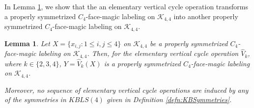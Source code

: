 \documentclass[10pt, reqno]{amsart}
\theoremstyle{definition}
\theoremstyle{plain}
\newtheorem{lemma}[definition]{Lemma}
\begin{document}
In Lemma \ref{lem:VerticalCycleOps}, we show that the
an elementary vertical cycle operation transforms a
properly symmetrized $C_4$-face-magic labeling on $\mathcal{K}_{4,4}$ into another
properly symmetrized $C_4$-face-magic labeling on $\mathcal{K}_{4,4}$.


\begin{lemma} \label{lem:VerticalCycleOps}
Let $X=\{ x_{i,j} : 1\le i,j\le 4\}$ on $\mathcal{K}_{4,4}$ 
be a properly symmetrized $C_4$-face-magic labeling on $\mathcal{K}_{4,4}$.
Then, for the elementary vertical cycle operation $\widehat{V}_k$, where $k\in\{2,3,4\}$,
$Y=\widehat{V}_k(X)$ is a properly symmetrized 
   $C_4$-face-magic labeling  on $\mathcal{K}_{4,4}$.
  

     Moreover, no sequence of elementary vertical cycle operations are 
    induced by any of the symmetries in
    $\mathit{KBLS}(4)$ given in Definition \ref{defn:KBSymmetries}.
\end{lemma}
\end{document}
